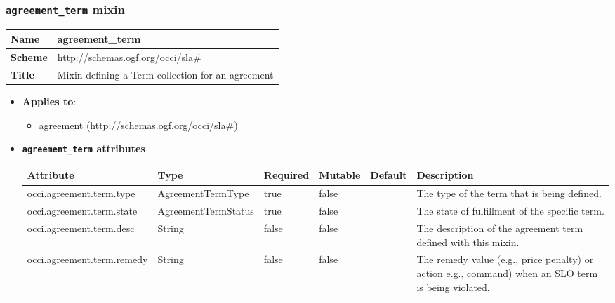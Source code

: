 \subsubsection{\texttt{agreement\_term} mixin}
\begin{center}
\begin{tabular}{|l|l|}
  \hline
  \textbf{Name} & agreement\_term \\
  \hline  
  \textbf{Scheme} & http://schemas.ogf.org/occi/sla\# \\
  \hline
  \textbf{Title} & Mixin defining a Term collection for an agreement \\
  \hline
\end{tabular}
\end{center}
\begin{itemize}
\item \textbf{Applies to}:
\begin{itemize}
	\item agreement (http://schemas.ogf.org/occi/sla\#)
\end{itemize}
\end{itemize} 

\begin{itemize}
\item \textbf{\texttt{agreement\_term} attributes}

\begin{tabularx}{\textwidth}{|l|l|p{1.4cm}|p{1.3cm}|l|X|}
  \hline
  \textbf{Attribute} & \textbf{Type} & \textbf{Required} & \textbf{Mutable} & \textbf{Default} & \textbf{Description} \\
  \hline  
  occi.agreement.term.type & AgreementTermType & true & false &  & The type of the term that is being defined. \\
  \hline
  occi.agreement.term.state & AgreementTermStatus & true & false &  & The state of fulfillment of the specific term. \\
  \hline
  occi.agreement.term.desc & String & false & false &  & The description of the agreement term defined with this mixin. \\
  \hline
  occi.agreement.term.remedy & String & false & false &  & The remedy value (e.g., price penalty) or action e.g., command) when an SLO term is being violated. \\
  \hline
\end{tabularx}
\end{itemize}


